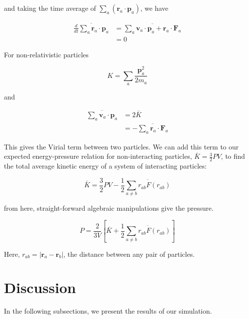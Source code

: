 \documentclass{article}
\begin{document}
\begin{multicols}{2}
\noindent and taking the time average of $\sum \limits _a (\textbf{r}_a \cdot \textbf{p}_a)$, we have

\begin{equation}
\begin{split}
\overline{\frac{d}{dt} \sum \limits _a \textbf{r}_a \cdot \textbf{p}_a} & = \overline{\sum \limits _a \textbf{v}_a \cdot \textbf{p}_a + \textbf{r}_a \cdot \textbf{F}_a} \\
& = 0
\end{split}
\end{equation}

\noindent  For non-relativistic particles 

\begin{equation}
K = \sum \limits _a \frac{\textbf{p}_{a}^2}{2m_a}
\end{equation}

\noindent and 

\begin{equation}
\begin{split}
\overline{\sum \limits _a \textbf{v}_a \cdot \textbf{p}_a} & = 2\bar{K} \\
& = - \overline{\sum \limits _a \textbf{r}_a \cdot \textbf{F}_a}
\end{split}
\end{equation}

\noindent This gives the Virial term between two particles.  We can add this term to our expected energy-pressure relation for non-interacting particles, $\bar{K}=\frac{3}{2}PV$, to find the total average kinetic energy of a system of interacting particles:  

\begin{equation}
\bar{K} = \frac{3}{2} PV - \frac{1}{2} \overline{\sum \limits _{a \ne b} r_{ab} F(r_{ab})}
\end{equation}

\noindent from here, straight-forward algebraic manipulations give the pressure.

\begin{equation}
P = \frac{2}{3V} \left [ \bar{K} + \frac{1}{2} \overline{\sum \limits _{a\ne b} r_{ab} F(r_{ab})} \right ]
\end{equation}

\noindent Here, $r_{ab} = |\textbf{r}_a - \textbf{r}_b|$, the distance between any pair of particles.

\section{Discussion}
\label{disc}
In the following subsections, we present the results of our simulation.


\end{multicols}
\end{document}
